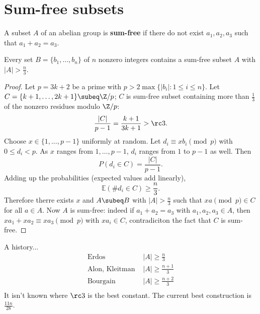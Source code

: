 \section{Sum-free subsets}
\begin{df}
A subset $A$ of an abelian group is \textbf{sum-free} if there do not exist $a_1,a_2,a_3$ such that $a_1+a_2=a_3$.
\end{df}
\begin{thm}
Every set $B=\{b_1,\ldots, b_n\}$ of $n$ nonzero integers contains a sum-free subset $A$ with $|A|> \frac n3$.
\end{thm}
\begin{proof}
Let $p=3k+2$ be a prime with $p>2\max\{|b_i|:1\leq i\leq n\}$.  
Let $C=\{k+1,\ldots, 2k+1\}\subeq \Z/p$; $C$ is sum-free subset containing more than $\frac 13$ of the nonzero residues modulo $\Z/p$:
\[\frac{|C|}{p-1}=\frac{k+1}{3k+1}>\rc 3.\]
Choose $x\in \{1,\ldots, p-1\}$ uniformly at random. Let $d_i\equiv xb_i\pmod{p}$ with $0\leq d_i<p$. As $x$ ranges from $1,\ldots, p-1$, $d_i$ ranges from $1$ to $p-1$ as well. Then
\[
P(d_i\in C)=\frac{|C|}{p-1}.
\]
Adding up the probabilities (expected values add linearly),
\[
\mathbb E(\#d_i\in C)\geq \frac n3.
\]
Therefore therre exists $x$ and $A\subeq B$ with $|A|>\frac n3$ such that $xa\pmod p\in C$ for all $a\in A$. Now $A$ is sum-free: indeed if $a_1+a_2=a_3$ with $a_1,a_2,a_3\in A$, then $xa_1+xa_2\equiv xa_3\pmod{p}$ with $xa_i\in C$, contradiciton the fact that $C$ is sum-free.
\end{proof}
A history...
\begin{align*}
\text{Er\"dos } &|A|\geq \frac n3\\
\text{Alon, Kleitman } & |A|\geq \frac{n+1}{3}\\
\text{Bourgain } & |A|\geq \frac{n+2}{3}\\
\end{align*}
It isn't known where $\rc 3$ is the best constant.
The current best construction is $\frac{11n}{28}$.
